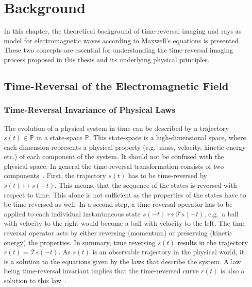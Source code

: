 
\chapter{Background}\label{chapter:background}
In this chapter, the theoretical background of time-reversal imaging and rays as model for electromagnetic waves according to Maxwell's equations is presented.
These two concepts are essential for understanding the time-reversal imaging process proposed in this thesis and its underlying physical principles. 

\section{Time-Reversal of the Electromagnetic Field}
\subsection{Time-Reversal Invariance of Physical Laws}
The evolution of a physical system in time can be described by a trajectory \(s(t) \in \mathbb{P}\) in a state-space \(\mathbb{P}\).
This state-space is a high-dimensional space, where each dimension represents a physical property (e.g.~mass, velocity, kinetic energy etc.) of each component of the system.
It should not be confused with the physical space.
In general the time-reversal transformation consists of two components~\parencite{roberts_reversing_2022}.
First, the trajectory \(s(t)\) has to be time-reversed by \(s(t) \mapsto s(-t)\).
This means, that the sequence of the states is reversed with respect to time.
This alone is not sufficient as the properties of the states have to be time-reversed as well.
In a second step, a time-reversal operator has to be applied to each individual instantaneous state \(s(-t) \mapsto \mathcal{T}s(-t)\), e.g.\ a ball with velocity to the right would become a ball with velocity to the left.
The time-reversal operator acts by either reversing (momentum) or preserving (kinetic energy) the properties.
In summary, time reversing \(s(t)\) results in the trajectory \(r(t)=\mathcal{T}s(-t)\). 
As \(s(t)\) is an observable trajectory in the physical world, it is a solution to the equations given by the laws that describe the system. 
A law being time-reversal invariant implies that the time-reversed curve \(r(t)\) is also a solution to this law~\parencite{roberts_time_2021}.

